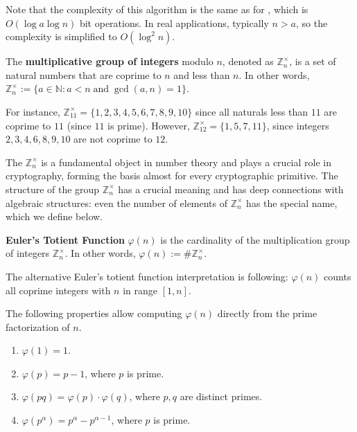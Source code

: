\documentclass[../../book.tex]{subfiles}
\begin{document}
\begin{remark}
    Note that the complexity of this algorithm is the same as for
    , which is $O(\log a \log n)$ bit operations. In real 
    applications, typically $n>a$, so the complexity is simplified to $O(\log^2 n)$.
\end{remark}

\begin{definition}
    The \textbf{multiplicative group of integers} modulo $n$, denoted as $\mathbb{Z}_n^{\times}$, is a set of natural numbers that are coprime to $n$ and less than $n$. In other words, $\mathbb{Z}_n^{\times} := \{a \in \mathbb{N}: a<n \; \text{and} \; \gcd(a, n) = 1\}$.
\end{definition}

\begin{example}
    For instance, $\mathbb{Z}_{11}^{\times} = \{1, 2, 3, 4, 5, 6, 7, 8, 9, 10\}$
    since all naturals less than $11$ are coprime to $11$ (since $11$ is prime).
    However, $\mathbb{Z}_{12}^{\times} = \{1, 5, 7, 11\}$, since integers $2, 3,
    4, 6, 8, 9, 10$ are not coprime to $12$. 
\end{example}

The $\mathbb{Z}_{n}^{\times}$ is a fundamental object in number theory and plays
a crucial role in cryptography, forming the basis almost for every cryptographic
primitive. The structure of the group $\mathbb{Z}_{n}^{\times}$ has a crucial
meaning and has deep connections with algebraic structures: even the number of 
elements of $\mathbb{Z}_n^{\times}$ has the special name, which we define below.

\begin{definition} \label{def:euler_totient_function}
    \textbf{Euler's Totient Function} $\varphi(n)$ is the cardinality of the multiplication 
    group of integers $\mathbb{Z}_n^{\times}$. In other words, $\varphi(n) := \#\mathbb{Z}_n^{\times}$.
\end{definition}

\begin{remark}
    The alternative Euler's totient function interpretation is following:
    $\varphi(n)$ counts all coprime integers with $n$ in range $[1, n]$. 
\end{remark}

The following properties allow computing $\varphi(n)$ directly from the prime 
factorization of $n$.

\begin{lemma}
    \hfill
    \begin{enumerate}
        \item $\varphi(1) = 1$.
        \item $\varphi(p) = p - 1$, where $p$ is prime.
        \item $\varphi(pq) = \varphi(p) \cdot \varphi(q)$, where $p, q$ are distinct primes.
        \item $\varphi(p^{\alpha}) = p^{\alpha} - p^{\alpha - 1}$, where $p$ is prime.        
    \end{enumerate}    
\end{lemma}
\end{document}
